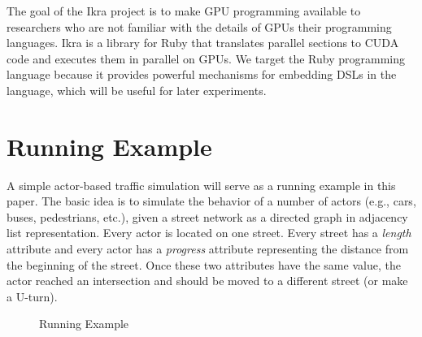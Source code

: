\documentclass{sigplanconf}
\begin{document}
The goal of the Ikra project is to make GPU programming available to researchers who are not familiar with the details of GPUs their programming languages. Ikra is a library for Ruby that translates parallel sections to CUDA code and executes them in parallel on GPUs. We target the Ruby programming language because it provides powerful mechanisms for embedding DSLs in the language, which will be useful for later experiments.

\section{Running Example}
A simple actor-based traffic simulation will serve as a running example in this paper. The basic idea is to simulate the behavior of a number of actors (e.g., cars, buses, pedestrians, etc.), given a street network as a directed graph in adjacency list representation. Every actor is located on one street. Every street has a \emph{length} attribute and every actor has a \emph{progress} attribute representing the distance from the beginning of the street. Once these two attributes have the same value, the actor reached an intersection and should be moved to a different street (or make a U-turn).

\begin{figure}[!htp]
    \centering
    
    \label{fig:running_example}%
    \caption{Running Example}
\end{figure}
\end{document}
